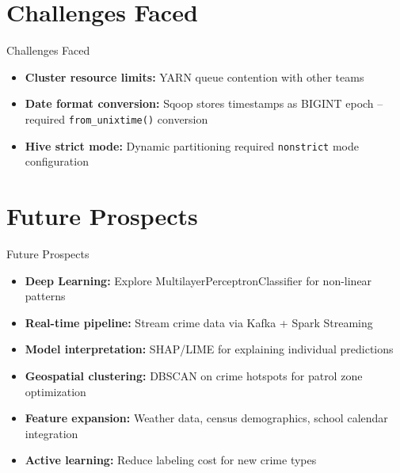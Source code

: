 \documentclass[10pt]{beamer}
\begin{document}
\section{Challenges Faced}

\begin{frame}{Challenges Faced}
\begin{itemize}
    \item \textbf{Cluster resource limits:} YARN queue contention with other teams
    \item \textbf{Date format conversion:} Sqoop stores timestamps as BIGINT epoch -- required \texttt{from\_unixtime()} conversion
    \item \textbf{Hive strict mode:} Dynamic partitioning required \texttt{nonstrict} mode configuration
\end{itemize}
\end{frame}

\section{Future Prospects}

\begin{frame}{Future Prospects}
\begin{itemize}
    \item \textbf{Deep Learning:} Explore MultilayerPerceptronClassifier for non-linear patterns
    \item \textbf{Real-time pipeline:} Stream crime data via Kafka + Spark Streaming
    \item \textbf{Model interpretation:} SHAP/LIME for explaining individual predictions
    \item \textbf{Geospatial clustering:} DBSCAN on crime hotspots for patrol zone optimization
    \item \textbf{Feature expansion:} Weather data, census demographics, school calendar integration
    \item \textbf{Active learning:} Reduce labeling cost for new crime types
\end{itemize}
\end{frame}

\end{document}

